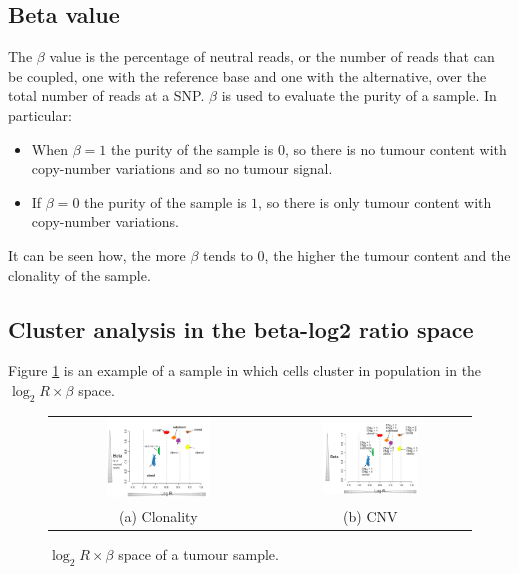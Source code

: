   \subsection{Beta value}
  The $\beta$ value is the percentage of neutral reads, or the number of reads that can be coupled, one with the reference base and one with the alternative, over the total number of reads at a SNP.
  $\beta$ is used to evaluate the purity of a sample.
  In particular:

  \begin{multicols}{2}
    \begin{itemize}
      \item When $\beta=1$ the purity of the sample is $0$, so there is no tumour content with copy-number variations and so no tumour signal.
      \item If $\beta=0$ the purity of the sample is $1$, so there is only tumour content with copy-number variations.
    \end{itemize}
  \end{multicols}

  It can be seen how, the more $\beta$ tends to $0$, the higher the tumour content and the clonality of the sample.

  \subsection{Cluster analysis in the beta-log2 ratio space}
  Figure \ref{fig:cluster0} is an example of a sample in which cells cluster in population in the $\log_2 R\times\beta$ space.

  \begin{figure}[H]
    \begin{tabular}{cc}
      \includegraphics[width=0.5\textwidth]{image2.png} &   \includegraphics[width=0.5\textwidth]{image3.png} \\
    (a) Clonality & (b) CNV \\[6pt]
    \end{tabular}
    \caption{$\log_2 R\times \beta$ space of a tumour sample.}
    \label{fig:cluster0}
  \end{figure}

